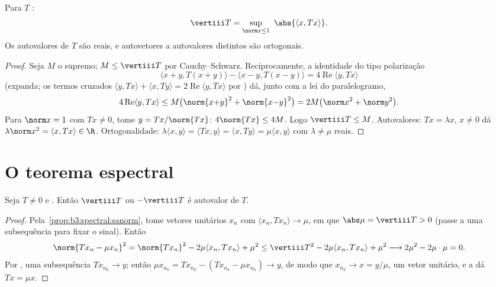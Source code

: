 \begin{proposition}\label{prop:b3:spectral:sanorm}
Para $T$ :
\[
\vertiii T = \sup_{\norm x \leq 1}\ \abs{\langle x,
Tx\rangle} .
\]
Os autovalores de $T$ são reais, e autovetores  a
autovalores distintos são ortogonais.
\end{proposition}

\begin{proof}
Seja $M$ o supremo; $M \leq \vertiii T$ por Cauchy--Schwarz. Reciprocamente, a
identidade do tipo polarização
\[
\langle x{+}y, T(x{+}y)\rangle - \langle x{-}y,
T(x{-}y)\rangle = 4\operatorname{Re}\langle y, Tx\rangle
\]
(expanda; os termos cruzados $\langle y, Tx\rangle + \langle x,
Ty\rangle = 2\operatorname{Re}\langle y, Tx\rangle$ por ) dá, junto com a lei
do paralelogramo,
\[
4\operatorname{Re}\langle y, Tx\rangle \leq
M\bigl(\norm{x{+}y}^2 + \norm{x{-}y}^2\bigr) = 2M\bigl(\norm
x^2 + \norm y^2\bigr).
\]
Para $\norm x = 1$ com $Tx \neq 0$, tome $y = Tx/\norm{Tx}$: $4\norm{Tx} \leq 4M$. Logo $\vertiii T \leq M$. Autovalores: $Tx = \lambda x$,
$x \ne 0$ dá $\lambda\norm x^2 = \langle
x, Tx\rangle \in \R$. Ortogonalidade: $\lambda\langle x,
y\rangle = \langle Tx, y\rangle = \langle x, Ty\rangle =
\mu\langle x, y\rangle$ com $\lambda \neq \mu$ reais.
\end{proof}

\section{O teorema espectral}

\begin{lemma}
\label{lem:b3:spectral:existence}
Seja $T \neq 0$  e . Então $\vertiii T$ ou $-\vertiii T$ é autovalor de
$T$.
\end{lemma}

\begin{proof}
Pela~\cref{prop:b3:spectral:sanorm}, tome vetores unitários $x_n$ com $\langle x_n, Tx_n\rangle \to \mu$, em que
$\abs\mu =
\vertiii T > 0$ (passe a uma subsequência para fixar o sinal). Então
\[
\norm{Tx_n - \mu x_n}^2
= \norm{Tx_n}^2 - 2\mu\langle x_n, Tx_n\rangle + \mu^2
\leq \vertiii T^2 - 2\mu\langle x_n, Tx_n\rangle + \mu^2
\longrightarrow 2\mu^2 - 2\mu\cdot\mu = 0 .
\]
Por , uma subsequência $Tx_{n_k} \to y$; então $\mu
x_{n_k} = Tx_{n_k} - (Tx_{n_k} - \mu x_{n_k}) \to y$, de modo que $x_{n_k} \to x = y/\mu$, um
vetor unitário, e a  dá $Tx = \mu x$.
\end{proof}

